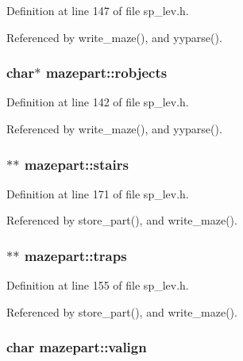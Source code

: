 Definition at line 147 of file sp\+\_\+lev.\+h.



Referenced by write\+\_\+maze(), and yyparse().

\hypertarget{structmazepart_a1b85e45830a065cd9e8897d3f189d1a0}{
\subsubsection[{robjects}]{\setlength{\rightskip}{0pt plus 5cm}char$\ast$ mazepart\+::robjects}}\label{structmazepart_a1b85e45830a065cd9e8897d3f189d1a0}


Definition at line 142 of file sp\+\_\+lev.\+h.



Referenced by write\+\_\+maze(), and yyparse().

\hypertarget{structmazepart_a55d211fb57dc124f377703c23e75e7fa}{
\subsubsection[{stairs}]{$\ast$$\ast$ mazepart\+::stairs}}\label{structmazepart_a55d211fb57dc124f377703c23e75e7fa}


Definition at line 171 of file sp\+\_\+lev.\+h.



Referenced by store\+\_\+part(), and write\+\_\+maze().

\hypertarget{structmazepart_a8a5efd939c3ffc35f4413d301f757138}{
\subsubsection[{traps}]{$\ast$$\ast$ mazepart\+::traps}}\label{structmazepart_a8a5efd939c3ffc35f4413d301f757138}


Definition at line 155 of file sp\+\_\+lev.\+h.



Referenced by store\+\_\+part(), and write\+\_\+maze().

\hypertarget{structmazepart_a6a02dfc895ce78e80abd0aeb2fdee848}{
\subsubsection[{valign}]{\setlength{\rightskip}{0pt plus 5cm}char mazepart\+::valign}}\label{structmazepart_a6a02dfc895ce78e80abd0aeb2fdee848}


